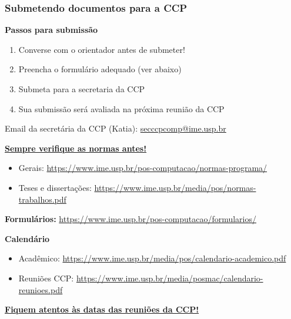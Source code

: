\documentclass{beamer}
\begin{document}
\begin{frame}
  \frametitle{Submetendo documentos para a CCP}

  \small
  \textbf{Passos para submissão}
  \begin{enumerate}\footnotesize
    \item Converse com o orientador antes de submeter!
    \item Preencha o formulário adequado (ver abaixo)
    \item Submeta para a secretaria da CCP
    \item Sua submissão será avaliada na próxima reunião da CCP
  \end{enumerate}
  Email da secretária da CCP (Katia): \url{secccpcomp@ime.usp.br}\pause

  \textbf{\underline{Sempre verifique as normas antes!}}
  \begin{itemize}\footnotesize
    \item Gerais: {\tiny\url{https://www.ime.usp.br/pos-computacao/normas-programa/}}
      \item Teses e dissertações: {\tiny\url{https://www.ime.usp.br/media/pos/normas-trabalhos.pdf}}
  \end{itemize}\pause

  \textbf{Formulários:} {\tiny\url{https://www.ime.usp.br/pos-computacao/formularios/}}

  \textbf{Calendário}
  \begin{itemize}\footnotesize
    \item Acadêmico: {\tiny\url{https://www.ime.usp.br/media/pos/calendario-academico.pdf}}
    \item Reuniões CCP: {\tiny\url{https://www.ime.usp.br/media/posmac/calendario-reunioes.pdf}}
  \end{itemize}\pause

  \textbf{\underline{Fiquem atentos às datas das reuniões da CCP!}}
\end{frame}
\end{document}
